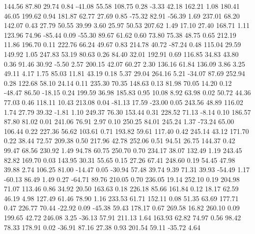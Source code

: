   144.56   87.80   29.74    0.84
  -41.08   55.58  108.75    0.28
   -3.33   42.18  162.21    1.08
  180.41   46.05  199.62    0.94
  181.87   62.77   27.69    0.85
  -75.32   82.91  -56.39    1.69
  237.01   68.20  142.07    0.43
   27.79   50.55   39.99    3.60
   25.97   50.53  207.62    1.49
   17.10   27.40  168.71    1.11
  123.96   74.96  -85.44    0.09
  -55.30   89.67   61.62    0.60
   73.80   75.38   48.75    0.65
  212.19   11.86  196.70    0.11
  222.76   66.24   49.67    0.83
  214.78   40.72  -87.24    0.48
  115.04   29.59  149.92    1.05
  247.83   53.19   80.63    0.26
   84.40   32.01  192.91    0.69
  116.85   34.83   43.80    0.36
   91.46   30.92   -5.50    2.57
  200.15   42.07   60.27    2.30
  136.16   61.84  136.09    3.86
    3.25   49.11    4.17    1.75
   85.03   11.81   43.19    0.18
    5.37   29.04  264.16    5.21
  -34.07   87.69  252.94    0.28
  122.68   58.10   24.14    0.11
  235.30   70.35  148.63    0.13
   81.98   70.05   14.20    0.12
  -48.47   86.50  -18.15    0.24
  199.59   36.98  185.83    0.95
   10.08    8.92   63.98    0.02
   50.72   44.36   77.03    0.46
  118.11   10.43  213.08    0.04
  -81.13   17.59  -23.00    0.05
  243.56   48.89  116.02    1.74
   27.79   39.32   -1.81    1.10
  249.37   76.30  153.44    0.31
  228.52   71.13   -8.14    0.10
  186.57   87.80   81.02    0.01
  241.06   76.91    2.97    0.10
  250.25   84.01  245.24    1.37
  -73.24   65.00  106.44    0.22
  227.36   56.62  103.61    0.71
  193.82   59.61  117.40    0.42
  245.14   43.12  171.70    0.22
   38.44   72.57  209.38    0.50
  217.96   42.78  252.06    0.51
   94.51   26.75  144.37    0.42
   99.47   68.56  230.92    1.49
   94.78   60.75  250.70    0.70
  234.17   38.07  132.49    1.19
  243.45   82.82  169.70    0.03
  143.95   30.31   55.65    0.15
   27.26   67.41  248.60    0.19
   54.45   47.98   39.88    2.74
  106.25   81.00  -14.47    0.05
  -30.94   57.48   39.74    9.39
   71.31   39.93  -54.49    1.17
  -60.13   86.49    1.49    0.27
  -64.71   89.76  210.05    0.70
  236.05   19.14  252.10    0.19
  204.98   71.07  113.46    0.86
   34.92   20.50  163.63    0.18
  226.18   85.66  161.84    0.12
   18.17   62.59   46.19    4.98
  127.49   61.46   78.90    1.16
  233.53   61.71  152.11    0.08
   51.35   63.69  177.71    0.47
  226.77   70.44  -22.92    0.09
  -45.38   59.43  178.17    0.67
  269.58   16.82  260.10    0.09
  199.65   42.72  246.08    3.25
  -36.13   57.91  211.13    1.64
  163.93   62.82   74.97    0.56
   98.42   78.33  178.91    0.02
  -36.91   87.16   27.38    0.93
  201.54   59.11  -35.72    4.64
